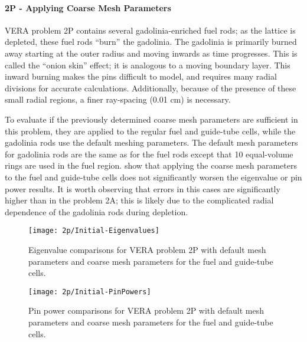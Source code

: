{{{{        \paragraph{2P - Applying Coarse Mesh Parameters}{
          \ac{VERA} problem 2P contains several gadolinia-enriched fuel rods; as the lattice is depleted, these fuel rods ``burn'' the gadolinia.
          The gadolinia is primarily burned away starting at the outer radius and moving inwards as time progresses.
          This is called the ``onion skin'' effect; it is analogous to a moving boundary layer.
          This inward burning makes the pins difficult to model, and requires many radial divisions for accurate calculations.
          Additionally, because of the presence of these small radial regions, a finer ray-spacing (0.01 cm) is necessary.

          To evaluate if the previously determined coarse mesh parameters are sufficient in this problem, they are applied to the regular fuel and guide-tube cells, while the gadolinia rods use the default meshing parameters.
          The default mesh parameters for gadolinia rods are the same as for the fuel rods except that 10 equal-volume rings are used in the fuel region.
           show that applying the coarse mesh parameters to the fuel and guide-tube cells does not significantly worsen the eigenvalue or pin power results.
          It is worth observing that errors in this cases are significantly higher than in the problem 2A; this is likely due to the complicated radial dependence of the gadolinia rods during depletion.

          \begin{figure}
              \centering
              \texttt{[image: 2p/Initial-Eigenvalues]}
              \caption{Eigenvalue comparisons for VERA problem 2P with default mesh parameters and coarse mesh parameters for the fuel and guide-tube cells.\label{fig:LSMOC:2P:Default Mesh:Eigenvalues}}
          \end{figure}
          \begin{figure}
            \centering
            \texttt{[image: 2p/Initial-PinPowers]}
            \caption{Pin power comparisons for VERA problem 2P with default mesh parameters and coarse mesh parameters for the fuel and guide-tube cells.\label{fig:LSMOC:2P:Default Mesh:PinPowers}}
          \end{figure}
        }
}}}}
